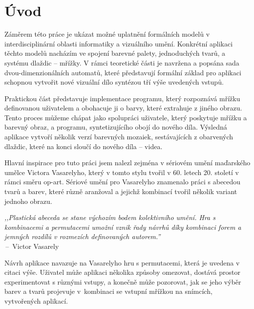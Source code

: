 
%

\chapter{Úvod}
\label{introduction}

Záměrem této práce je ukázat možné uplatnění formálních modelů v interdisciplinární oblasti informatiky a vizuálního umění. Konkrétní aplikaci těchto modelů nacházím ve spojení barevné palety, jednoduchých tvarů, a systému dlaždic -- mřížky. V rámci teoretické části je navržena a popsána sada dvou-dimenzionálních automatů, které představují formální základ pro aplikaci schopnou vytvořit nové vizuální dílo syntézou tří výše uvedených vstupů. 

Praktickou část představuje implementace programu, který rozpoznává mřížku definovanou uživatelem a obohacuje ji o barvy, které extrahuje z jiného obrazu. Tento proces můžeme chápat jako spolupráci uživatele, který poskytuje mřížku a barevný obraz, a programu, syntetizujícího obojí do nového díla. Výsledná aplikace vytvoří několik verzí barevných mozaiek, sestávajících z obarvených dlaždic, které na konci sloučí do nového díla -- videa. 

Hlavní inspirace pro tuto práci jsem nalezl zejména v sériovém umění maďarského umělce Victora Vasarelyho, který v tomto stylu tvořil v 60. letech 20. století v rámci směru op-art. Sériové umění pro Vasarelyho znamenalo práci s abecedou tvarů a barev, které různě aranžoval a jejichž kombinací tvořil několik variant jednoho obrazu. 

\begin{displayquote}
\emph{,,Plastická abeceda se stane výchozím bodem kolektivního umění. Hra s kombinacemi a permutacemi umožní vznik řady návrhů díky kombinaci forem a jemných rozdílů v rozmezích definovaných autorem.''}\\
    \bigskip
    \hfill \,--\,  Victor Vasarely \cite{museum}
\end{displayquote}

Návrh aplikace navazuje na Vasarelyho hru s permutacemi, která je uvedena v citaci výše. Uživatel může aplikaci několika způsoby omezovat, dostává prostor experimentovat s různými vstupy, a konečně může pozorovat, jak se jeho výběr barev a tvarů projevuje v~kombinaci se vstupní mřížkou na snímcích, vytvořených aplikací. 

